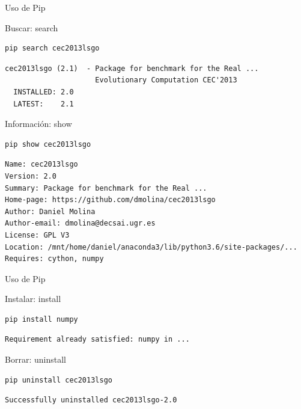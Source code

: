 \documentclass[bigger,unknownkeysallowed]{beamer}
\begin{document}
\begin{frame}[fragile,label={sec:org39086fd}]{Uso de Pip}
 \begin{block}{Buscar: search}
\begin{verbatim}
pip search cec2013lsgo
\end{verbatim}
\scriptsize
\begin{verbatim}
cec2013lsgo (2.1)  - Package for benchmark for the Real ...
                     Evolutionary Computation CEC'2013
  INSTALLED: 2.0
  LATEST:    2.1
\end{verbatim}
\end{block}

\begin{block}{Información: show}
\begin{verbatim}
pip show cec2013lsgo
\end{verbatim}
\scriptsize
\begin{verbatim}
Name: cec2013lsgo
Version: 2.0
Summary: Package for benchmark for the Real ...
Home-page: https://github.com/dmolina/cec2013lsgo
Author: Daniel Molina
Author-email: dmolina@decsai.ugr.es
License: GPL V3
Location: /mnt/home/daniel/anaconda3/lib/python3.6/site-packages/...
Requires: cython, numpy
\end{verbatim}
\end{block}
\end{frame}

\begin{frame}[fragile,label={sec:orgec4bf45}]{Uso de Pip}
 \begin{block}{Instalar: install}
\begin{verbatim}
pip install numpy
\end{verbatim}
\scriptsize
\begin{verbatim}
Requirement already satisfied: numpy in ...
\end{verbatim}
\end{block}

\begin{block}{Borrar: uninstall}
\begin{verbatim}
pip uninstall cec2013lsgo
\end{verbatim}
\scriptsize
\begin{verbatim}
Successfully uninstalled cec2013lsgo-2.0
\end{verbatim}
\end{block}
\end{frame}
\end{document}
